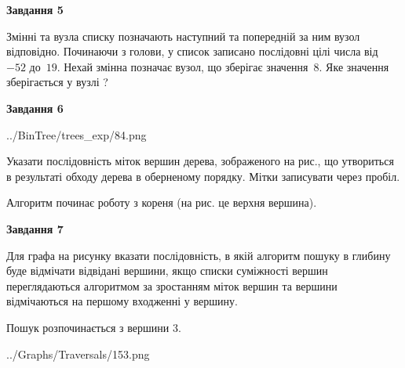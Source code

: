 \documentclass[12pt, ukrainian]{article}
\begin{document}
{\begin {large}
{\begin {center}\textbf{Завдання 5}\end {center}}\par
Змінні  та  вузла списку позначають наступний та попередній за ним вузол відповідно. Починаючи з голови, у список записано послідовні цілі числа від~$-52$ до~$19$. Нехай змінна  позначає вузол, що зберігає значення~$8$.
Яке значення зберігається у вузлі  ?\par
\newpage

{\begin {center}\textbf{Завдання 6}\end {center}}\par

\begin{center}
	{../BinTree/trees_exp/84.png}
\end{center}
Указати послідовність міток вершин дерева, зображеного на рис., що утвориться в результаті обходу дерева в оберненому порядку. Мітки записувати через пробіл.\par Алгоритм починає роботу з кореня (на рис. це верхня вершина).\par
\newpage

{\begin {center}\textbf{Завдання 7}\end {center}}\par
Для графа на рисунку вказати послідовність, в якій алгоритм пошуку в глибину буде відмічати відвідані вершини, якщо списки суміжності вершин переглядаються алгоритмом за зростанням міток вершин та вершини відмічаються на першому вход\-женні у вершину.\par
Пошук розпочинається з вершини 3.\par

\begin{center}
	{../Graphs/Traversals/153.png}
\end{center}\par
\newpage


\end{large}}
\end{document}
